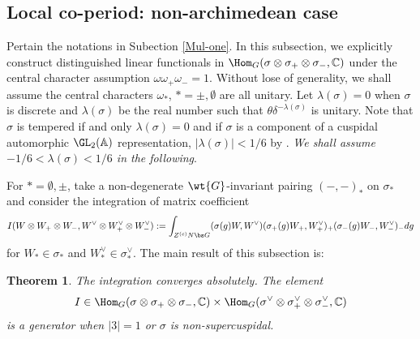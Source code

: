 \documentclass[11pt,reqno]{amsart}
\newcommand{\BA}{{\mathbb {A}}} \newcommand{\BB}{{\mathbb {B}}}
\newcommand{\BC}{{\mathbb {C}}} \newcommand{\BD}{{\mathbb {D}}}
\theoremstyle{plain}
\newtheorem{thm}{Theorem}[section] \newtheorem{cor}[thm]{Corollary}
\theoremstyle{remark} \newtheorem{remark}[thm]{Remark}
\theoremstyle{definition} \newtheorem{exercise}[thm]{Exercise}
\theoremstyle{definition} \newtheorem{example}[thm]{Example} \newtheorem{condition}[thm]{Condition}
\numberwithin{equation}{section}
\renewcommand{\-}{\text{--}}
\begin{document}
\subsection{Local  co-period: non-archimedean case}\label{Tri}
 Pertain the notations in Subection \ref{Mul-one}. In this subsection, we   explicitly construct distinguished linear functionals in $\Hom_G(\sigma\otimes\sigma_+\otimes\sigma_-,\BC)$ under the central character assumption $\omega\omega_+\omega_-=1$. Without lose of generality, we shall assume the central characters $\omega_*$, $*=\pm, \emptyset$ are all unitary. Let $\lambda(\sigma)=0$ when $\sigma$ is discrete and $\lambda(\sigma)$ be the real number such that $\theta\delta^{-\lambda(\sigma)}$ is unitary.  Note that $\sigma$ is tempered if and only $\lambda(\sigma)=0$ and if $\sigma$ is a component of a cuspidal automorphic $\GL_2(\BA)$ representation, $|\lambda(\sigma)|<1/6$ by \cite{KS99}. \textit{We shall assume $-1/6<\lambda(\sigma)<1/6$ in the following}.
 
For $*=\emptyset,\pm$, take a non-degenerate $\wt{G}$-invariant pairing $(-,-)_*$ on $\sigma_*$ and consider the  integration of matrix coefficient 
 \[I(W\otimes W_+\otimes W_-, W^\vee\otimes W_+^\vee\otimes W_-^\vee):=\int_{Z^{(c)}N\bs G}( \sigma(g)W, W^\vee) ( \sigma_+(g)W_+, W_+^\vee)_+ (\sigma_-(g)W_-, W_-^\vee)_- dg\]
 for $W_*\in\sigma_*$ and $W_*^\vee\in\sigma_*^\vee$. The main result of this subsection is:
 \begin{thm}\label{Canonical local period}
   The integration converges absolutely. The element \[I\in \Hom_{G}(\sigma\otimes\sigma_+\otimes\sigma_-,\BC)\times \Hom_{G}(\sigma^\vee\otimes\sigma_+^\vee\otimes\sigma_-^\vee,\BC)\] is  a generator when  $|3|=1$ or $\sigma$ is non-supercuspidal.
\end{thm}
\end{document}
